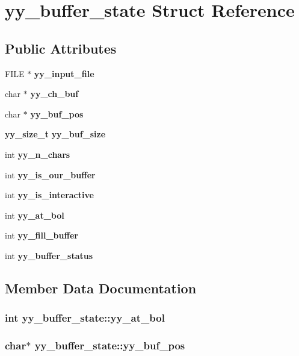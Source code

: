 \section{yy\_\-buffer\_\-state  Struct Reference}
\label{structyy__buffer__state}
\subsection*{Public Attributes}
\begin{CompactItemize}
\item 
FILE $\ast$ {\bf yy\_\-input\_\-file}
\item 
char $\ast$ {\bf yy\_\-ch\_\-buf}
\item 
char $\ast$ {\bf yy\_\-buf\_\-pos}
\item 
{\bf yy\_\-size\_\-t} {\bf yy\_\-buf\_\-size}
\item 
int {\bf yy\_\-n\_\-chars}
\item 
int {\bf yy\_\-is\_\-our\_\-buffer}
\item 
int {\bf yy\_\-is\_\-interactive}
\item 
int {\bf yy\_\-at\_\-bol}
\item 
int {\bf yy\_\-fill\_\-buffer}
\item 
int {\bf yy\_\-buffer\_\-status}
\end{CompactItemize}


\subsection{Member Data Documentation}
\subsubsection{\setlength{\rightskip}{0pt plus 5cm}int yy\_\-buffer\_\-state::yy\_\-at\_\-bol}\label{structyy__buffer__state_m7}


\subsubsection{\setlength{\rightskip}{0pt plus 5cm}char$\ast$ yy\_\-buffer\_\-state::yy\_\-buf\_\-pos}\label{structyy__buffer__state_m2}



